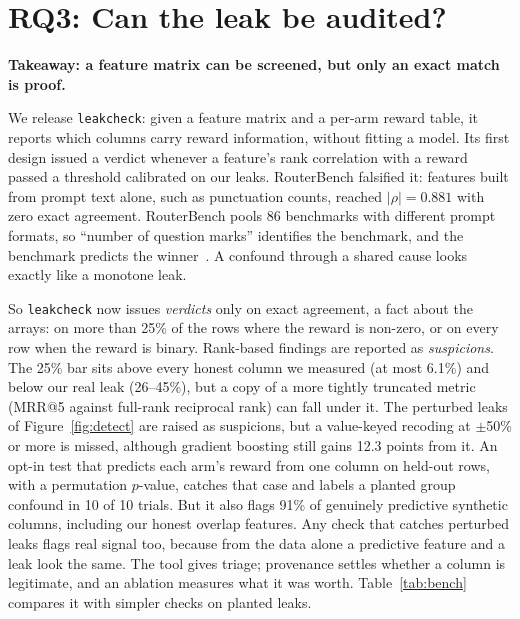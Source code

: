 \documentclass{article}
\begin{document}
\section{RQ3: Can the leak be audited?}
\label{sec:tool}

\textbf{Takeaway: a feature matrix can be screened, but only an exact match is proof.}

We release \texttt{leakcheck}: given a feature matrix and a per-arm reward table, it reports which
columns carry reward information, without fitting a model. Its first design issued a verdict
whenever a feature's rank correlation with a reward passed a threshold calibrated on our leaks.
RouterBench falsified it: features built from prompt text alone, such as punctuation counts,
reached $|\rho|{=}0.881$ with zero exact agreement. RouterBench pools 86 benchmarks with different
prompt formats, so ``number of question marks'' identifies the benchmark, and the benchmark
predicts the winner~\cite{lee2026tasktype}. A confound through a shared cause looks exactly like a
monotone leak.

So \texttt{leakcheck} now issues \emph{verdicts} only on exact agreement, a fact about the arrays:
on more than 25\% of the rows where the reward is non-zero, or on every row when the reward is
binary. Rank-based findings are reported as \emph{suspicions}. The 25\% bar sits above every
honest column we measured (at most 6.1\%) and below our real leak (26--45\%), but a copy of a
more tightly truncated metric (MRR@5 against full-rank reciprocal rank) can fall under it. The
perturbed leaks of
Figure~\ref{fig:detect} are raised as suspicions, but a value-keyed recoding at $\pm$50\% or more
is missed, although gradient boosting still gains 12.3 points from it. An opt-in
test that predicts each arm's reward from one column on held-out rows, with a permutation
$p$-value, catches that case and labels a planted group confound in 10 of 10 trials. But it also
flags 91\% of genuinely predictive synthetic columns, including our honest overlap features. Any
check that catches perturbed leaks flags real signal too, because from the data alone a
predictive feature and a leak look the same. The tool gives triage; provenance settles whether a
column is legitimate, and an ablation measures what it was worth. Table~\ref{tab:bench} compares it with simpler checks on planted leaks.
\end{document}
